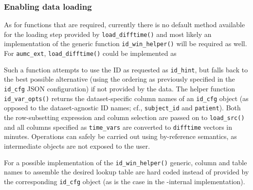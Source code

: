 \documentclass[
  notitle,
  nojss,
  noheadings]{jss}
\begin{document}
\hypertarget{enabling-data-loading}{%
\subsubsection{Enabling data loading}\label{enabling-data-loading}}

As for functions that are required, currently there is no default method
available for the loading step provided by \texttt{load\_difftime()} and
most likely an implementation of the generic function
\texttt{id\_win\_helper()} will be required as well. For
\texttt{aumc\_ext}, \texttt{load\_difftime()} could be implemented as

\begin{CodeChunk}
\end{CodeChunk}

Such a function attempts to use the ID as requested as
\texttt{id\_hint}, but falls back to the best possible alternative
(using the ordering as previously specified in the \texttt{id\_cfg} JSON
configuration) if not provided by the data. The helper function
\texttt{id\_var\_opts()} returns the dataset-specific column names of an
\texttt{id\_cfg} object (as opposed to the dataset-agnostic ID names;
cf., \texttt{subject\_id} and \texttt{patient}). Both the row-subsetting
expression and column selection are passed on to \texttt{load\_src()}
and all columns specified as \texttt{time\_vars} are converted to
\texttt{difftime} vectors in minutes. Operations can safely be carried
out using by-reference semantics, as intermediate objects are not
exposed to the user.

For a possible implementation of the \texttt{id\_win\_helper()} generic,
column and table names to assemble the desired lookup table are hard
coded instead of provided by the corresponding \texttt{id\_cfg} object
(as is the case in the -internal implementation).
\end{document}

